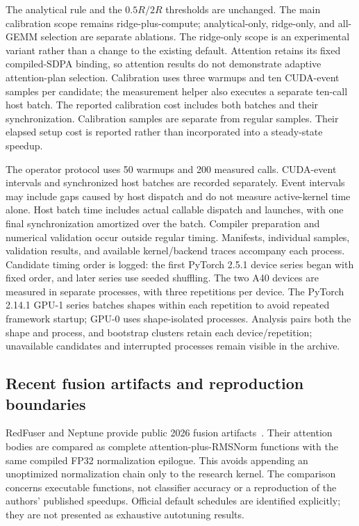 The analytical rule and the $0.5R/2R$ thresholds are unchanged.
The main calibration scope remains ridge-plus-compute; analytical-only, ridge-only, and all-GEMM selection are separate ablations.
The ridge-only scope is an experimental variant rather than a change to the existing default.
Attention retains its fixed compiled-SDPA binding, so attention results do not demonstrate adaptive attention-plan selection.
Calibration uses three warmups and ten CUDA-event samples per candidate; the measurement helper also executes a separate ten-call host batch.
The reported calibration cost includes both batches and their synchronization.
Calibration samples are separate from regular samples.
Their elapsed setup cost is reported rather than incorporated into a steady-state speedup.

The operator protocol uses 50 warmups and 200 measured calls.
CUDA-event intervals and synchronized host batches are recorded separately.
Event intervals may include gaps caused by host dispatch and do not measure active-kernel time alone.
Host batch time includes actual callable dispatch and launches, with one final synchronization amortized over the batch.
Compiler preparation and numerical validation occur outside regular timing.
Manifests, individual samples, validation results, and available kernel/backend traces accompany each process.
Candidate timing order is logged: the first PyTorch 2.5.1 device series began with fixed order, and later series use seeded shuffling.
The two A40 devices are measured in separate processes, with three repetitions per device.
The PyTorch 2.14.1 GPU-1 series batches shapes within each repetition to avoid repeated framework startup; GPU-0 uses shape-isolated processes.
Analysis pairs both the shape and process, and bootstrap clusters retain each device/repetition; unavailable candidates and interrupted processes remain visible in the archive.

\subsection{Recent fusion artifacts and reproduction boundaries}
\label{sec:research-artifacts}

RedFuser and Neptune provide public 2026 fusion artifacts~\cite{Tang2026RedFuser,Zhao2026Neptune}.
Their attention bodies are compared as complete attention-plus-RMSNorm functions with the same compiled FP32 normalization epilogue.
This avoids appending an unoptimized normalization chain only to the research kernel.
The comparison concerns executable functions, not classifier accuracy or a reproduction of the authors' published speedups.
Official default schedules are identified explicitly; they are not presented as exhaustive autotuning results.

